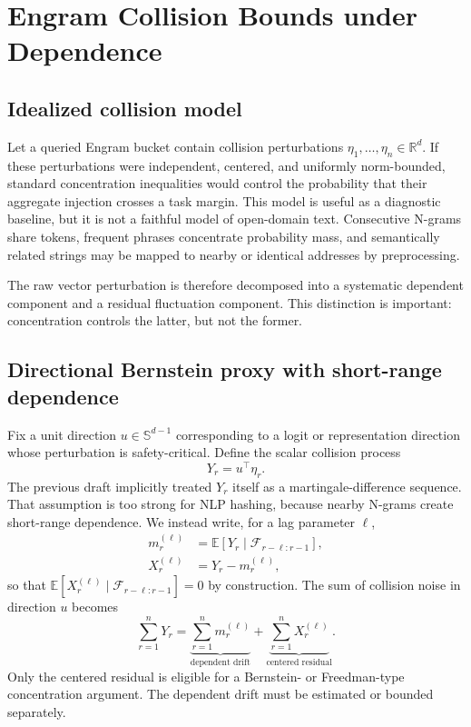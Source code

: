 \documentclass[11pt]{article}
\newcommand{\E}{\mathbb{E}}
\begin{document}
\section{Engram Collision Bounds under Dependence}
\label{app:engram}

\subsection{Idealized collision model}

Let a queried Engram bucket contain collision perturbations $\eta_1,\ldots,\eta_n\in\mathbb{R}^d$. If these perturbations were independent, centered, and uniformly norm-bounded, standard concentration inequalities would control the probability that their aggregate injection crosses a task margin. This model is useful as a diagnostic baseline, but it is not a faithful model of open-domain text. Consecutive N-grams share tokens, frequent phrases concentrate probability mass, and semantically related strings may be mapped to nearby or identical addresses by preprocessing.

The raw vector perturbation is therefore decomposed into a systematic dependent component and a residual fluctuation component. This distinction is important: concentration controls the latter, but not the former.

\subsection{Directional Bernstein proxy with short-range dependence}

Fix a unit direction $u\in\mathbb{S}^{d-1}$ corresponding to a logit or representation direction whose perturbation is safety-critical. Define the scalar collision process
\begin{equation}
Y_r = u^\top \eta_r .
\end{equation}
The previous draft implicitly treated $Y_r$ itself as a martingale-difference sequence. That assumption is too strong for NLP hashing, because nearby N-grams create short-range dependence. We instead write, for a lag parameter $\ell$,
\begin{align}
m_r^{(\ell)} &= \E\!\left[Y_r\mid \mathcal{F}_{r-\ell:r-1}\right], \\
X_r^{(\ell)} &= Y_r - m_r^{(\ell)},
\end{align}
so that $\E[X_r^{(\ell)}\mid \mathcal{F}_{r-\ell:r-1}]=0$ by construction. The sum of collision noise in direction $u$ becomes
\begin{equation}
\sum_{r=1}^{n}Y_r
= \underbrace{\sum_{r=1}^{n}m_r^{(\ell)}}_{\text{dependent drift}}
+ \underbrace{\sum_{r=1}^{n}X_r^{(\ell)}}_{\text{centered residual}}.
\end{equation}
Only the centered residual is eligible for a Bernstein- or Freedman-type concentration argument. The dependent drift must be estimated or bounded separately.
\end{document}
